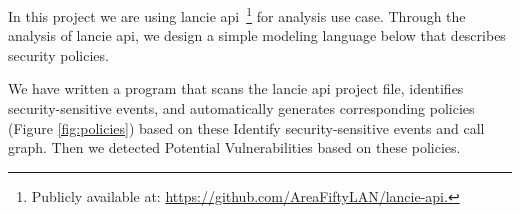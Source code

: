 


In this project we are using lancie api~\footnote{Publicly available at:
  \url{https://github.com/AreaFiftyLAN/lancie-api.}} for analysis use case.
%
Through the analysis of lancie api, we design a simple modeling language below
that describes security policies.

We have written a program that scans the lancie api project file, identifies
security-sensitive events, and automatically generates corresponding
policies (Figure \ref{fig:policies}) based on these Identify security-sensitive
events and call graph. Then we detected Potential Vulnerabilities based on these
policies.

